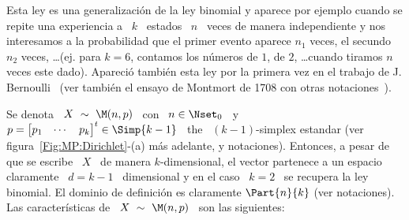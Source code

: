 \label{Sssec:MP:Multinomial}

Esta ley es una generalizaci\'on de la ley binomial y aparece por ejemplo cuando
se  repite  una  experiencia  a  \  $k$  \ estados  \  $n$  \  veces  de  manera
independiente y nos  interesamos a la probabilidad que  el primer evento aparece
$n_1$ veces,  el secundo  $n_2$ veces, \ldots  (ej. para  $k = 6$,  contamos los
n\'umeros de $1$, de $2$, \ldots cuando tiramos $n$ veces este dado). Apareci\'o
tambi\'en   esta   ley   por   la    primera   vez   en   el   trabajo   de   J.
Bernoulli~\cite{Ber1713, Hal90,  DavEdw01} (ver tambi\'en el  ensayo de Montmort
de 1708 con otras notaciones~\cite{Mon13}).

Se  denota  \  $X  \ \sim  \  \M(n,p)$  \  con  \  $n  \in  \Nset_0$ \  y  \  $p
= \begin{bmatrix}  p_1 & \cdots  & p_k \end{bmatrix}^t  \in \Simp{k-1}$ \  the \
$(k-1)$-simplex estandar  (ver figura~\ref{Fig:MP:Dirichlet}-(a) m\'as adelante,
y  notaciones).   Entonces,  a pesar  de  que  se  escribe  \  $X$ \  de  manera
$k$-dimensional,  el vector  partenece a  un espacio  claramente \  $d =  k-1$ \
dimensional y en el caso \ $k = 2$ \ se recupera la ley binomial.  El dominio de
definici\'on es claramente $\Part{n}{k}$ (ver notaciones). Las caracter\'isticas
de \ $X \ \sim \ \M(n,p)$ \ son las siguientes:

